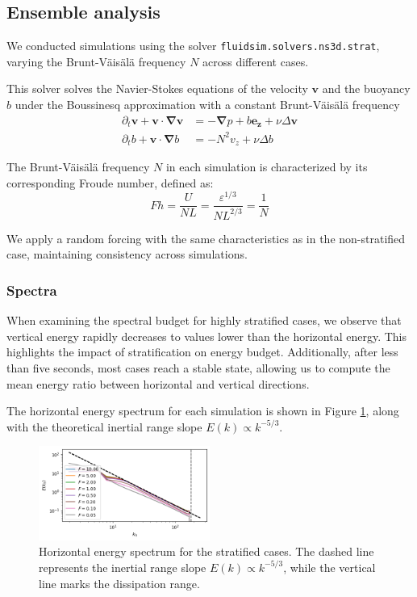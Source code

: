 \documentclass[final,5p,times,twocolumn,authoryear]{elsarticle}
\begin{document}
\subsection{Ensemble analysis}

We conducted simulations using the solver \texttt{fluidsim.solvers.ns3d.strat}, varying the Brunt-Väisälä frequency $N$ across different cases.

This solver solves the Navier-Stokes equations of the velocity $\textbf{v}$ and the buoyancy $b$ under the Boussinesq approximation with a constant Brunt-Väisälä frequency
\begin{align*}
	\partial_t \textbf{v} + \textbf{v} \cdot \boldsymbol{\nabla} \textbf{v} & = - \boldsymbol{\nabla} p + b \textbf{e}_\textbf{z} + \nu \Delta \textbf{v} \\
    \partial_t b  + \textbf{v} \cdot \boldsymbol{\nabla} b & = - N^2 v_z + \nu \Delta b
\end{align*}

The Brunt-Väisälä frequency $N$ in each simulation is characterized by its corresponding Froude number, defined as:
\begin{equation*}
    Fh = \frac{U}{NL} = \frac{\varepsilon^{1/3}}{N L^{2/3}} = \frac{1}{N}
\end{equation*}

We apply a random forcing with the same characteristics as in the non-stratified case, maintaining consistency across simulations.

\subsubsection{Spectra}

When examining the spectral budget for highly stratified cases, we observe that vertical energy rapidly decreases to values lower than the horizontal energy. This highlights the impact of stratification on energy budget. Additionally, after less than five seconds, most cases reach a stable state, allowing us to compute the mean energy ratio between horizontal and vertical directions.

The horizontal energy spectrum for each simulation is shown in Figure \ref{fig:multi spectrum}, along with the theoretical inertial range slope $E(k) \propto k^{-5/3}$.

\begin{figure}[h]
\centering
\includegraphics[width=0.5\textwidth]{fig/multi_Ekh_kh.png}
\caption{Horizontal energy spectrum for the stratified cases. The dashed line represents the inertial range slope $E(k) \propto k^{-5/3}$, while the vertical line marks the dissipation range.}
\label{fig:multi spectrum}
\end{figure}
\end{document}
